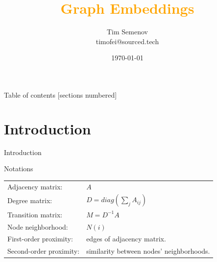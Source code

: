 \documentclass[10pt,aspectratio=169]{beamer}
\title{\textcolor{orange}{Graph Embeddings}}
\date{\today}
\author{Tim Semenov\\ \textcolor{vividblue}{timofei@sourced.tech}}
\begin{document}
\maketitle


\begin{frame}{Table of contents}
  [sections numbered]
  \tableofcontents[hideallsubsections]
\end{frame}


\section{Introduction}

{
\begin{frame}[fragile]{Introduction}
\end{frame}
}

\begin{frame}[fragile]{Notations}
  \begin{tabular}{ l l }
    Adjacency matrix: & $A$ \\
    Degree matrix: & $D=diag(\sum_j A_{ij})$ \\
    Transition matrix: & $M=D^{-1}A$\\
    Node neighborhood: & $N(i)$\\[4mm]
    \pause
    First-order proximity: & edges of adjacency matrix.\\
    Second-order proximity: & similarity between nodes' neighborhoods.
  \end{tabular}
\end{frame}
\end{document}
